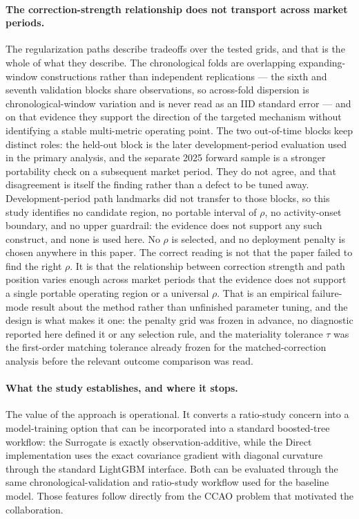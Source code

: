 \documentclass[10pt]{article}
\theoremstyle{definition}
\newcommand{\1}{\mathbf{1}}
\begin{document}
\paragraph{The correction-strength relationship does not transport across market
periods.}
The regularization paths describe tradeoffs over the tested grids, and that is the whole
of what they describe. The chronological folds are overlapping expanding-window constructions rather
than independent replications --- the sixth and seventh validation blocks share observations, so
across-fold dispersion is chronological-window variation and is never read as an IID standard error
--- and on that evidence they support the direction of the targeted mechanism without identifying a
stable multi-metric operating point. The two out-of-time blocks keep distinct roles: the held-out
block is the later development-period evaluation used in the primary analysis, and the separate 2025
forward sample is a stronger portability check on a subsequent market period. They do not agree, and
that disagreement is itself the finding rather than a defect to be tuned away. Development-period
path landmarks did not transfer to those blocks, so this study identifies no candidate region, no
portable interval of $\rho$, no activity-onset boundary, and no upper guardrail: the evidence does
not support any such construct, and none is used here. No $\rho$ is selected, and no deployment
penalty is chosen anywhere in this paper. The correct reading is not that the paper failed to find
the right $\rho$. It is that the relationship between correction strength and path position varies
enough across market periods that the evidence does not support a single portable operating region
or a universal $\rho$. That is an empirical failure-mode result about the method rather than
unfinished parameter tuning, and the design is what makes it one: the penalty grid was frozen in
advance, no diagnostic reported here defined it or any selection rule, and the materiality tolerance
$\tau$ was the first-order matching tolerance already frozen for the matched-correction analysis
before the relevant outcome comparison was read.

\paragraph{What the study establishes, and where it stops.}
The value of the approach is operational. It converts a ratio-study concern into a model-training option that can be incorporated into a standard boosted-tree workflow: the Surrogate is exactly observation-additive, while the Direct implementation uses the exact covariance gradient with diagonal curvature through the standard LightGBM interface. Both can be evaluated through the same chronological-validation and ratio-study workflow used for the baseline model. Those features follow directly from the CCAO problem that motivated the collaboration.
\end{document}
